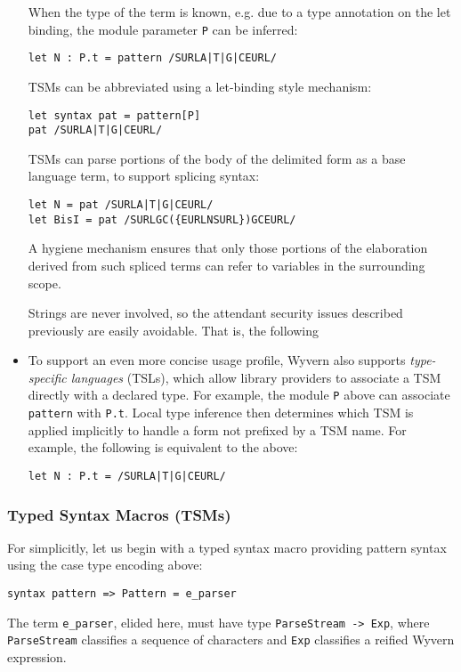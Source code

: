 \begin{itemize}
When the type of the term is known, e.g. due to a type annotation on the let binding, the module parameter \lstinline{P} can be inferred:
\begin{lstlisting}[numbers=none]
let N : P.t = pattern /SURLA|T|G|CEURL/
\end{lstlisting}

TSMs can be abbreviated using a let-binding style mechanism:
\begin{lstlisting}[numbers=none]
let syntax pat = pattern[P]
pat /SURLA|T|G|CEURL/
\end{lstlisting}

TSMs can parse portions of the body of the delimited form as a base language term, to support splicing syntax:
\begin{lstlisting}[numbers=none]
let N = pat /SURLA|T|G|CEURL/
let BisI = pat /SURLGC({EURLNSURL})GCEURL/
\end{lstlisting}
A hygiene mechanism ensures that only those portions of the elaboration derived from such spliced terms can refer to variables in the surrounding scope.

Strings are never involved, so the attendant security issues described previously are easily avoidable. That is, the following 

\item To support an even more concise usage profile, Wyvern also  supports \emph{type-specific languages} (TSLs), which allow library providers to associate a TSM directly with a declared type. For example, the module \lstinline{P} above can associate \lstinline{pattern} with \lstinline{P.t}. Local type inference then determines which TSM is applied implicitly to handle a form not prefixed by a TSM name. For example, the following is equivalent to the above:
\begin{lstlisting}[numbers=none]
let N : P.t = /SURLA|T|G|CEURL/
\end{lstlisting}
\end{itemize}
\subsubsection{Typed Syntax Macros (TSMs)}\label{sec:tsms}
For simplicitly, let us begin with a typed syntax macro providing pattern syntax using the case type encoding above:
\begin{lstlisting}[numbers=none]
syntax pattern => Pattern = e_parser
\end{lstlisting}
The term \lstinline{e_parser}, elided here, must have type \lstinline{ParseStream -> Exp}, where \lstinline{ParseStream} classifies a sequence of characters and \lstinline{Exp} classifies a reified Wyvern expression. 


